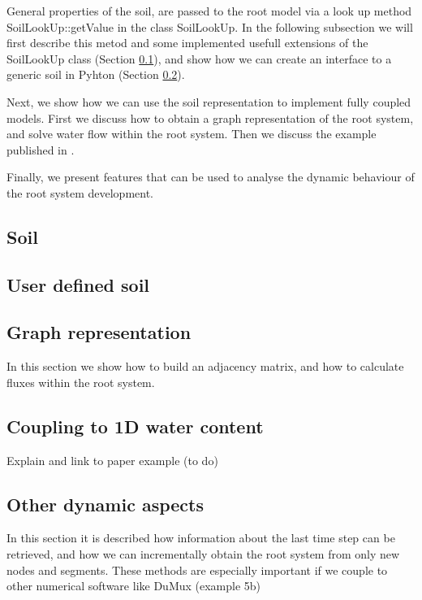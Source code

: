 \documentclass[a4paper]{article}
\begin{document}
General properties of the soil, are passed to the root model via a look up method SoilLookUp::getValue in the class SoilLookUp. 
In the following subsection we will first describe this metod and some implemented usefull extensions of the SoilLookUp class (Section \ref{sec:soil}), 
and show how we can create an interface to a generic soil in Pyhton (Section \ref{sec:usersoil}). 

Next, we show how we can use the soil representation to implement fully coupled models. First we discuss how to obtain a graph representation of the root system, and solve water flow within the root system. 
Then we discuss the example published in \cite{}. 

Finally, we present features that can be used to analyse the dynamic behaviour of the root system development.



\subsection{Soil} \label{sec:soil}


\subsection{User defined soil} \label{sec:usersoil}




\subsection{Graph representation} \label{sec:graph} 

In this section we show how to build an adjacency matrix, and how to calculate fluxes within the root system.



\subsection{Coupling to 1D water content} \label{sec:fullcoupling} 

Explain and link to paper example (to do)



\subsection{Other dynamic aspects} \label{sec:published}

In this section it is described how information about the last time step can be retrieved, 
and how we can incrementally obtain the root system from only new nodes and segments. 
These methods are especially important if we couple to other numerical software like DuMux (example 5b)







\end{document}
